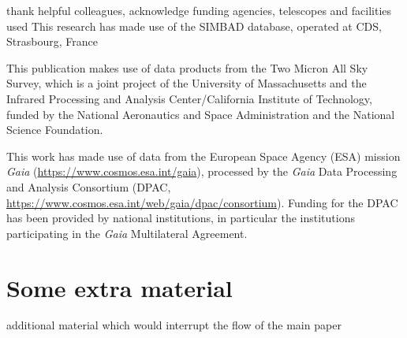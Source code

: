 \documentclass[fleqn,usenatbib,letters]{mnras}%
\begin{document}
thank helpful colleagues, acknowledge funding agencies, telescopes and facilities used
This research has made use of the SIMBAD database,
operated at CDS, Strasbourg, France~\citep{wenger2000}

This publication makes use of data products from the Two Micron All Sky Survey, which is a joint project of the University of Massachusetts and the Infrared Processing and Analysis Center/California Institute of Technology, funded by the National Aeronautics and Space Administration and the National Science Foundation.

This work has made use of data from the European Space Agency (ESA) mission {\it Gaia} (\url{https://www.cosmos.esa.int/gaia}), processed by the {\it Gaia} Data Processing and Analysis Consortium (DPAC, \url{https://www.cosmos.esa.int/web/gaia/dpac/consortium}). Funding for the DPAC has been provided by national institutions, in particular the institutions participating in the {\it Gaia} Multilateral Agreement.










\appendix

\section{Some extra material}

additional material which would interrupt the flow of the main paper




\bsp	%
\label{lastpage}
\end{document}

